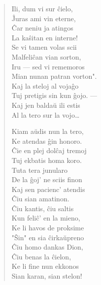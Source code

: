 \begin{verse}
                        Ili, dum vi sur \^cielo,\\
                        \^Juras ami vin eterne,\\
                        \^Car neniu ja atingos\\
                        La ka\^sitan en interne!\\
                        Se vi tamen volas scii\\
                        Malfeli\^can vian sorton,\\
                        Iru --- sed vi rememoros\\
                        Mian nunan patran vorton".\\
                        Kaj la steloj al voja\^go\\
                        Tuj pretigis sin kun \^gojo. ---\\
                        Kaj jen balda\u u ili estis\\
                        Al la tero sur la vojo\dots

\asterism{}

                        Kiam a\u udis nun la tero,\\
                        Ke atendas \^gin honoro.\\
                        \^Cie en plej dol\^caj tremoj\\
                        Tuj ekbatis homa koro.\\
                        Tuta tera junularo\\
                        De la \^goj' ne sciis finon\\
                        Kaj sen pacienc' atendis\\
                        \^Ciu sian amatinon.\\
                        \^Ciu kantis, \^ciu saltis\\
                        Kun feli\^c' en la mieno,\\
                        Ke li havos de proksime\\
                        "\^Sin" en sia \^cirka\u upreno\\
                        \^Ciu homo dankas Dion,\\
                        \^Ciu benas la \^cielon,\\
                        Ke li fine nun ekkonos\\
                        Sian karan, sian stelon!


\end{verse}
